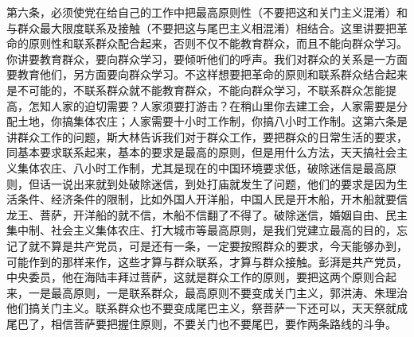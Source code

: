 第六条，必须使党在给自己的工作中把最高原则性（不要把这和关门主义混淆）和与群众最大限度联系及接触（不要把这与尾巴主义相混淆）相结合。这里讲要把革命的原则性和联系群众配合起来，否则不仅不能教育群众，而且不能向群众学习。你讲要教育群众，要向群众学习，要倾听他们的呼声。我们对群众的关系是一方面要教育他们，另方面要向群众学习。不这样想要把革命的原则和联系群众结合起来是不可能的，不联系群众就不能教育群众，不能向群众学习，不联系群众怎能提高，怎知人家的迫切需要？人家须要打游击？在稍山里你去建工会，人家需要是分配土地，你搞集体农庄；人家需要十小时工作制，你搞八小时工作制。这第六条是讲群众工作的问题，斯大林告诉我们对于群众工作，要把群众的日常生活的要求，同基本要求联系起来，基本的要求是最高的原则，但是用什么方法，天天搞社会主义集体农庄、八小时工作制，尤其是现在的中国环境要求低，破除迷信是最高原则，但话一说出来就到处破除迷信，到处打庙就发生了问题，他们的要求是因为生活条件、经济条件的限制，比如外国人开洋船，中国人民是开木船，开木船就要信龙王、菩萨，开洋船的就不信，木船不信翻了不得了。破除迷信，婚姻自由、民主集中制、社会主义集体农庄、打大城市等最高原则，是我们党建立最高的目的，忘记了就不算是共产党员，可是还有一条，一定要按照群众的要求，今天能够办到，可能作到的那样来作，这些才算与群众联系，才算与群众接触。彭湃是共产党员，中央委员，他在海陆丰拜过菩萨，这就是群众工作的原则，要把这两个原则合起来，一是最高原则，一是联系群众，最高原则不要变成关门主义，郭洪涛、朱理治他们搞关门主义。联系群众也不要变成尾巴主义，祭菩萨一下还可以，天天祭就成尾巴了，相信菩萨要把握住原则，不要关门也不要尾巴，要作两条路线的斗争。

